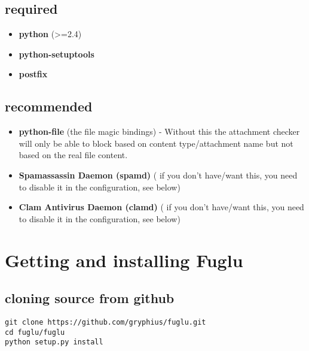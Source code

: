 \documentclass[letterpaper,10pt,english]{sphinxmanual}
\begin{document}
\subsection{required}
\label{installation-index:required}\begin{itemize}
\item {} 
\textbf{python} (\textgreater{}=2.4)

\item {} 
\textbf{python-setuptools}

\item {} 
\textbf{postfix}

\end{itemize}


\subsection{recommended}
\label{installation-index:recommended}\begin{itemize}
\item {} 
\textbf{python-file} (the file magic bindings) - Without this the attachment checker will only be able to block based on content type/attachment name but not based on the real file content.

\item {} 
\textbf{Spamassassin Daemon (spamd)} ( if you don't have/want this, you need to disable it in the configuration, see below)

\item {} 
\textbf{Clam Antivirus Daemon (clamd)} ( if you don't have/want this, you need to disable it in the configuration, see below)

\end{itemize}


\section{Getting and installing Fuglu}
\label{installation-index:getting-and-installing-fuglu}

\subsection{cloning source from github}
\label{installation-index:cloning-source-from-github}
\begin{Verbatim}[commandchars=\\\{\}]
git clone https://github.com/gryphius/fuglu.git
cd fuglu/fuglu
python setup.py install
\end{Verbatim}
\end{document}
